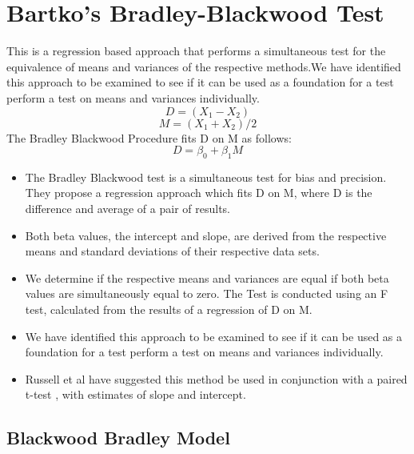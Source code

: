 \documentclass[]{article}
\begin{document}
\section{Bartko's Bradley-Blackwood Test}
This is a regression based
approach that performs a simultaneous test for the equivalence of
means and variances of the respective methods.We have identified
this approach  to be examined to see if it can be used as a
foundation for a test perform a test on
means and variances individually.
\begin{equation}
D = (X_{1}-X_{2})
\end{equation}
\begin{equation}
M = (X_{1} + X_{2}) /2
\end{equation}
The Bradley Blackwood Procedure fits D on M as follows:\\
\begin{equation}
D = \beta_{0} + \beta_{1}M
\end{equation}
\begin{itemize}
\item The Bradley Blackwood test is a simultaneous test for bias and
precision. They propose a regression approach which fits D on M,
where D is the difference and average of a pair of results.
\item Both beta values, the intercept and slope, are derived from the respective means and
standard deviations of their respective data sets.
\item We determine if the respective means and variances are equal if
both beta values are simultaneously equal to zero. The Test is
conducted using an F test, calculated from the results of a
regression of D on M.
\item We have identified this approach  to be examined to see if it can
be used as a foundation for a test perform a test on means and
variances individually.
\item Russell et al have suggested this method be used in conjunction
with a paired t-test , with estimates of slope and intercept.
\end{itemize}

\subsection{Blackwood Bradley Model} 
\end{document}

